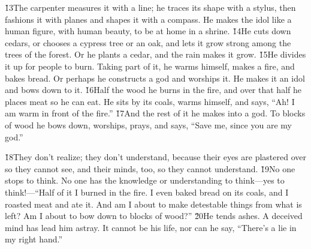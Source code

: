 \v{13}The carpenter measures it with a line; he traces its shape with a stylus, then fashions it with planes and shapes it with a compass. He makes the idol like a human figure, with human beauty, to be at home in a shrine. \v{14}He cuts down cedars, or chooses a cypress tree or an oak, and lets it grow strong among the trees of the forest. Or he plants a cedar, and the rain makes it grow. \v{15}He divides it up for people to burn. Taking part of it, he warms himself, makes a fire, and bakes bread. Or perhaps he constructs a god and worships it. He makes it an idol and bows down to it. \v{16}Half the wood he burns in the fire, and over that half he places meat so he can eat. He sits by its coals, warms himself, and says, ``Ah! I am warm in front of the fire.'' \v{17}And the rest of it he makes into a god. To blocks of wood he bows down, worships, prays, and says, ``Save me, since you are my god.''

\v{18}They don't realize; they don't understand, because their eyes are plastered over so they cannot see, and their minds, too, so they cannot understand. \v{19}No one stops to think. No one has the knowledge or understanding to think---yes to think!---``Half of it I burned in the fire. I even baked bread on its coals, and I roasted meat and ate it. And am I about to make detestable things from what is left? Am I about to bow down to blocks of wood?'' \v{20}He tends ashes. A deceived mind has lead him astray. It cannot be his life, nor can he say, ``There's a lie in my right hand.''

